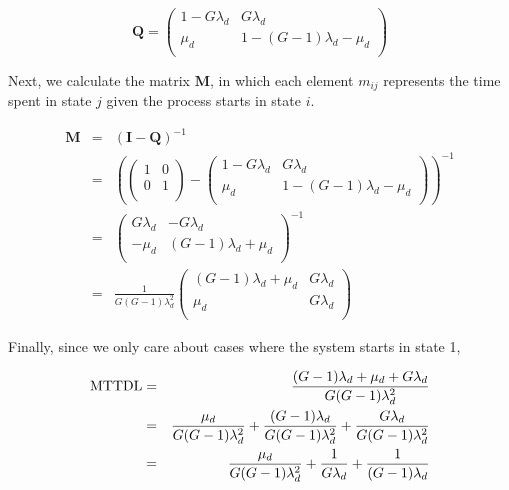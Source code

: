 \documentclass[11pt]{article}
\newcommand{\mttdl}{{\rm MTTDL}}
\numberwithin{equation}{section}
\begin{document}
\begin{displaymath}
\mathbf{Q} =
\left( \begin{array}{cc}
1 - G \lambda_{d} &  G \lambda_{d}  \\
\mu_{d}           & 1 -  (G - 1)\lambda_{d} - \mu_{d}  \\
\end{array} \right)
\end{displaymath}

Next, we calculate the matrix $\mathbf{M}$, in which each element $m_{ij}$
represents the time spent in state $j$ given the process starts in state $i$.

\begin{eqnarray}
\mathbf{M} & = & (\mathbf{I} - \mathbf{Q})^{-1} \\
& = & \left( 
\left( \begin{array}{cc}
1 & 0 \\
0 & 1 \\
\end{array} \right) - 
\left( \begin{array}{cc}
1 - G \lambda_{d} &  G \lambda_{d}  \\
\mu_{d}           & 1 -  (G - 1)\lambda_{d} - \mu_{d}  \\
\end{array} \right)
\right)^{-1} 
\\
& = & 
\left( \begin{array}{cc}
G \lambda_{d} &  - G \lambda_{d}  \\
- \mu_{d}     & (G - 1)\lambda_{d} + \mu_{d}  \\
\end{array} \right)^{-1} 
\\
& = & 
\frac{1}
{G (G - 1)\lambda_{d}^{2}}
\left( \begin{array}{cc}
(G - 1)\lambda_{d} + \mu_{d} &  G \lambda_{d}  \\
\mu_{d}     & G \lambda_{d}  \\
\end{array} \right)
\end{eqnarray}

Finally, since we only care about cases where the system starts in state 1,

\begin{eqnarray}
\mttdl & = & 
\frac{(G - 1)\lambda_{d} + \mu_{d} + G \lambda_{d}}
{G (G - 1)\lambda_{d}^{2}} 
\\
& = & 
\frac{\mu_{d}}{G (G - 1)\lambda_{d}^{2}} + 
\frac{(G - 1)\lambda_{d}}{G (G - 1)\lambda_{d}^{2}} + 
\frac{G \lambda_{d}}{G (G - 1)\lambda_{d}^{2}} 
\\
& = & 
\frac{\mu_{d}}{G (G - 1)\lambda_{d}^{2}} + 
\frac{1}{G \lambda_{d}} + 
\frac{1}{(G - 1)\lambda_{d}} 
\end{eqnarray}
\end{document}
